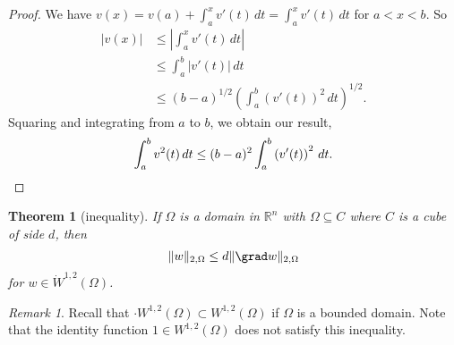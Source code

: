 \documentclass[10pt, oneside, reqno]{amsart}
\theoremstyle{plain}%
\newtheorem{thm}{Theorem}[section]
\numberwithin{equation}{section}
\theoremstyle{definition}
\theoremstyle{remark}
\newtheorem*{rem}{Remark}
\newcommand{\R}{\mathbb{R}}
\begin{document}
\begin{proof}
    We have $v(x) = v(a) + \int_a^x v'(t) \, dt = \int_a^x v'(t) \, dt$ for $a < x < b$.  So \begin{align*}
        |v(x)|  &\leq \left| \int_a^x v'(t) \, dt \right| \\
                &\leq \int_a^b |v'(t)| \, dt \\
                &\leq (b-a)^{1/2} \left( \int_a^b \left(v'(t) \right)^2 \, dt \right)^{1/2}.  
    \end{align*}  Squaring and integrating from $a$ to $b$, we obtain our result, \[
        \int_a^b v^2(t) \, dt \leq (b-a)^2 \int_a^b \left(v'(t) \right)^2 \, dt. \qedhere
    \]
\end{proof}

\begin{thm}[\poincare inequality]
    \label{thm:poincare_inequality}
    If $\Omega$ is a domain in $\R^n$ with $\Omega \subseteq C$ where $C$ is a cube of side $d$, then 
    \begin{equation}
        \label{eq:poincare_inequality}
        \| w \|_{2, \Omega} \leq d \| \grad w \|_{2, \Omega}
    \end{equation}
    for $w \in \dot W^{1, 2}(\Omega)$.
\end{thm}

\begin{rem}
    Recall that $\cdot W^{1, 2}(\Omega) \subset W^{1, 2}(\Omega)$ if $\Omega$ is a bounded domain.  Note that the identity function $1 \in W^{1, 2}(\Omega)$ does not satisfy this inequality.
\end{rem}
\end{document}
